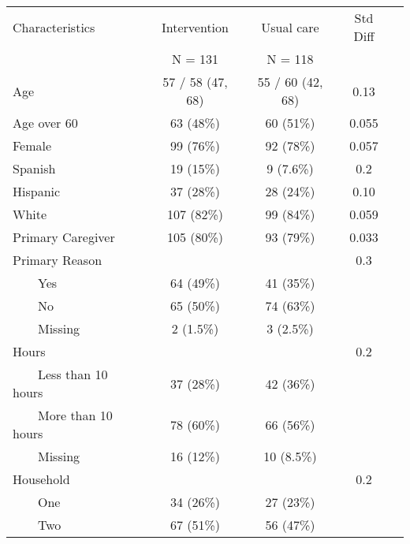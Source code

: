\documentclass[
  letterpaper,
  DIV=11,
  numbers=noendperiod]{scrreprt}
\begin{document}
\begin{tabular}{lcccc}
  \hline
 Characteristics & Intervention & Usual care & Std Diff \\ 
  &  N = 131 & N = 118 & \\ 
  \hline
   Age & 57 / 58 (47, 68) & 55 / 60 (42, 68) & 0.13 \\ 
   Age over 60 & 63 (48\%) & 60 (51\%) & 0.055 \\ 
   Female & 99 (76\%) & 92 (78\%) &  0.057 \\ 
   Spanish & 19 (15\%) & 9 (7.6\%) & 0.2 \\ 
   Hispanic & 37 (28\%) & 28 (24\%) & 0.10 \\ 
   White & 107 (82\%) & 99 (84\%) & 0.059 \\ 
   Primary Caregiver & 105 (80\%) & 93 (79\%) & 0.033 \\ 
   Primary Reason &  &  & 0.3 \\ 
   \ \ \ \ Yes & 64 (49\%) & 41 (35\%) &  \\ 
   \ \ \ \ No & 65 (50\%) & 74 (63\%) &  \\ 
   \ \ \ \ Missing & 2 (1.5\%) & 3 (2.5\%) &  \\ 
   Hours &  &  & 0.2 \\ 
   \ \ \ \ Less than 10 hours & 37 (28\%) & 42 (36\%) &  \\ 
   \ \ \ \ More than 10 hours & 78 (60\%) & 66 (56\%) &  \\ 
   \ \ \ \ Missing & 16 (12\%) & 10 (8.5\%) &  \\ 
   Household &  &  & 0.2 \\ 
   \ \ \ \ One & 34 (26\%) & 27 (23\%) &  \\ 
   \ \ \ \ Two & 67 (51\%) & 56 (47\%) &  \\

\end{tabular}
\end{document}
